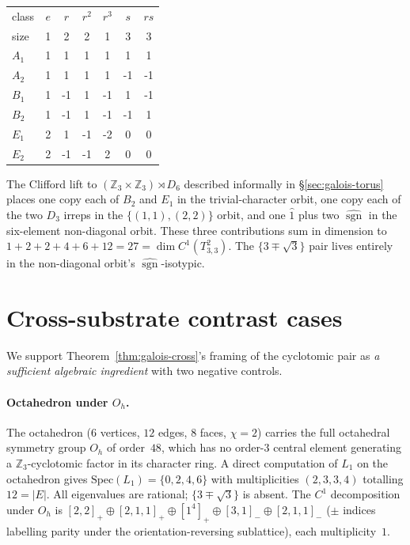 \documentclass[12pt,a4paper]{article}
\theoremstyle{definition}
\theoremstyle{remark}
\newcommand{\bZ}{\mathbb{Z}}
\DeclareMathOperator{\sgn}{sgn}
\begin{document}
\smallskip
\begin{center}\small
\begin{tabular}{lcccccc}
\toprule
class & $e$ & $r$ & $r^2$ & $r^3$ & $s$ & $rs$ \\
size  & 1   & 2   & 2     & 1     & 3   & 3    \\
\midrule
$A_1$ & 1 &  1 &  1 &  1 &  1 &  1 \\
$A_2$ & 1 &  1 &  1 &  1 & -1 & -1 \\
$B_1$ & 1 & -1 &  1 & -1 &  1 & -1 \\
$B_2$ & 1 & -1 &  1 & -1 & -1 &  1 \\
$E_1$ & 2 &  1 & -1 & -2 &  0 &  0 \\
$E_2$ & 2 & -1 & -1 &  2 &  0 &  0 \\
\bottomrule
\end{tabular}
\end{center}

The Clifford lift to $(\bZ_3 \times \bZ_3) \rtimes D_6$ described
informally in \S\ref{sec:galois-torus} places one copy each of
$B_2$ and $E_1$ in the trivial-character orbit, one copy each of
the two $D_3$ irreps in the $\{(1,1),(2,2)\}$ orbit, and one $\widehat 1$
plus two $\widehat{\sgn}$ in the six-element non-diagonal orbit.
These three contributions sum in dimension to $1 + 2 + 2 + 4 + 6 + 12
= 27 = \dim C^1(T^2_{3,3})$. The $\{3 \mp \sqrt 3\}$ pair lives
entirely in the non-diagonal orbit's $\widehat{\sgn}$-isotypic.

\section{Cross-substrate contrast cases}\label{app:cross-substrate}

We support Theorem~\ref{thm:galois-cross}'s framing of the cyclotomic
pair as \emph{a sufficient algebraic ingredient} with two negative
controls.

\paragraph{Octahedron under $O_h$.}
The octahedron ($6$ vertices, $12$ edges, $8$ faces, $\chi = 2$) carries
the full octahedral symmetry group $O_h$ of order~$48$, which has no
order-$3$ central element generating a $\bZ_3$-cyclotomic factor in its
character ring. A direct computation of $L_1$ on the octahedron gives
$\mathrm{Spec}(L_1) = \{0, 2, 4, 6\}$ with multiplicities
$(2, 3, 3, 4)$ totalling $12 = |E|$. All eigenvalues are rational;
$\{3 \mp \sqrt 3\}$ is absent. The $C^1$ decomposition under $O_h$ is
$[2,2]_+ \oplus [2,1,1]_+ \oplus [1^4]_+ \oplus [3,1]_- \oplus [2,1,1]_-$
($\pm$ indices labelling parity under the orientation-reversing
sublattice), each multiplicity~$1$.
\end{document}
